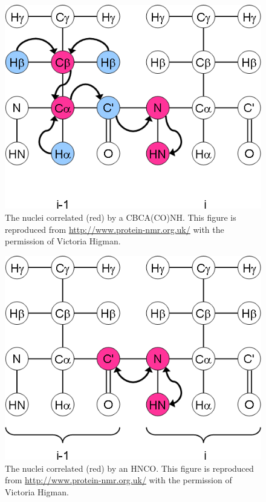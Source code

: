 \begin{figure}
  \includegraphics[scale=0.75]{figures/ccpn_cbcaconh}
  \caption[The nuclei correlated by a CBCA(CO)NH.]
          {The nuclei correlated (red) by a CBCA(CO)NH.
           This figure is reproduced from \url{http://www.protein-nmr.org.uk/}
           with the permission of Victoria Higman.}
  \label{ccpn_cbcaconh}
\end{figure}

\begin{figure}
  \includegraphics[scale=0.75]{figures/ccpn_hnco}
  \caption[The nuclei correlated by an HNCO.]
          {The nuclei correlated (red) by an HNCO.
           This figure is reproduced from \url{http://www.protein-nmr.org.uk/}
           with the permission of Victoria Higman.}
  \label{ccpn_hnco}
\end{figure}

